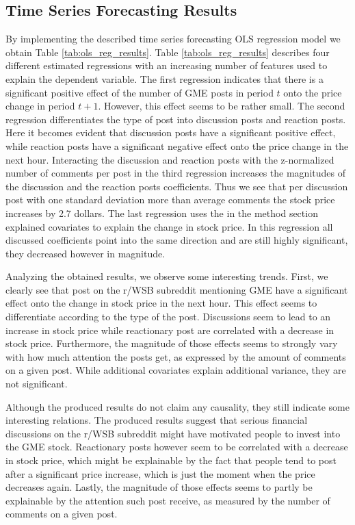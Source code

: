 \documentclass[noacm,sigconf,authorversion]{acmart}
\begin{document}
\subsection{Time Series Forecasting Results}
By implementing the described time series forecasting OLS regression model we obtain Table \ref{tab:ols_reg_results}. Table \ref{tab:ols_reg_results} describes four different estimated regressions with an increasing number of features used to explain the dependent variable. The first regression  indicates that there is a significant positive effect of the number of GME posts in period $t$ onto the price change in period $t+1$. However, this effect seems to be rather small. The second regression differentiates the type of post into discussion posts and reaction posts. Here it becomes evident that discussion posts have a significant positive effect, while reaction posts have a significant negative effect onto the price change in the next hour. Interacting the discussion and reaction posts with the z-normalized number of comments per post in the third regression increases the magnitudes of the discussion and the reaction posts coefficients. Thus we see that per discussion post with one standard deviation more than average comments the stock price increases by 2.7 dollars. The last regression uses the in the method section explained covariates to explain the change in stock price. In this regression all discussed coefficients point into the same direction and are still highly significant, they decreased however in magnitude. \par
Analyzing the obtained results, we observe some interesting trends. First, we clearly see that post on the r/WSB subreddit mentioning GME have a significant effect onto the change in stock price in the next hour. This effect seems to differentiate according to the type of the post. Discussions seem to lead to an increase in stock price while reactionary post are correlated with a decrease in stock price. Furthermore, the magnitude of those effects seems to strongly vary with how much attention the posts get, as expressed by the amount of comments on a given post. While additional covariates explain additional variance, they are not significant. \par
Although the produced results do not claim any causality, they still indicate some interesting relations. The produced results suggest that serious financial discussions on the r/WSB subreddit might have motivated people to invest into the GME stock. Reactionary posts however seem to be correlated with a decrease in stock price, which might be explainable by the fact that people tend to post after a significant price increase, which is just the moment when the price decreases again. Lastly, the magnitude of those effects seems to partly be explainable by the attention such post receive, as measured by the number of comments on a given post.
\end{document}
